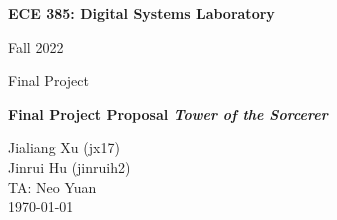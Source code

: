 \begin{titlepage}
    \begin{center}
            
        \Large
        \textbf{ECE 385: Digital Systems Laboratory}
            
        \vspace{0.2cm}
        Fall 2022
        
        \vspace{0.2cm}
        Final Project

        \vfill
        
        \Huge
        \textbf{Final Project Proposal \textit{Tower of the Sorcerer}}
            
        \vfill
            
        \Large
        Jialiang Xu (jx17)\\
        Jinrui Hu (jinruih2)\\
        TA: Neo Yuan\\
        \today
            
    \end{center}
\end{titlepage}
